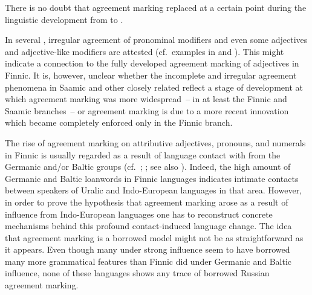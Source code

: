{%
There is no doubt that agreement marking replaced  at a certain point during the linguistic development from  to .

In several , irregular agreement of pronominal modifiers and even some adjectives and adjective-like modifiers are attested (cf.~examples in \citealt{honti1997} and \citealt[288–295]{stolz2015a}). This might indicate a connection to the fully developed agreement marking of adjectives in Finnic. It is, however, unclear whether the incomplete and irregular agreement phenomena in Saamic and other closely related  reflect a stage of development at which agreement marking was more widespread~– in at least the Finnic and Saamic branches~– or agreement marking is due to a more recent innovation which became completely enforced only in the Finnic branch. 


The rise of agreement marking on attributive adjectives, pronouns, and numerals in Finnic is usually regarded as a result of language contact with  from the Germanic and/or Baltic groups (cf.~\citealt[25]{tauli1955}; \citealt{hajdu1996}; see also \citealt[288–295]{stolz2015a}). Indeed, the high amount of Germanic and Baltic loanwords in Finnic languages indicates intimate contacts between speakers of Uralic and Indo-European languages in that area. However, in order to prove the hypothesis that agreement marking arose as a result of influence from Indo-European languages one has to reconstruct concrete mechanisms behind this profound contact-induced language change. The idea that agreement marking is a borrowed model might not be as straightforward as it appears. Even though many  under strong  influence seem to have borrowed many more grammatical features than Finnic did under Germanic and Baltic influence, none of these languages shows any trace of borrowed Russian agreement marking.

}
